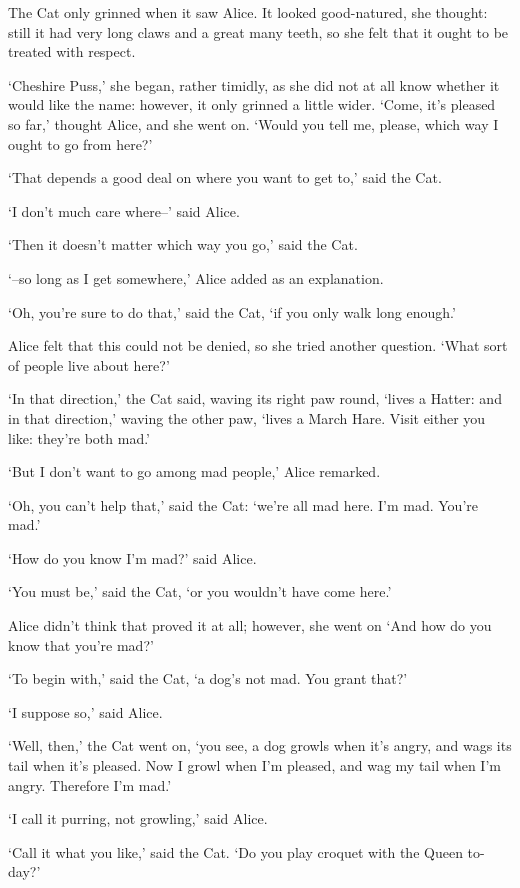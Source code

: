 \documentclass[statementpaper,twoside,openany]{memoir}
\begin{document}
The Cat only grinned when it saw Alice. It looked good-natured, she thought: still it had very long claws and a great many teeth, so she felt that it ought to be treated with respect.

`Cheshire Puss,' she began, rather timidly, as she did not at all know whether it would like the name: however, it only grinned a little wider. `Come, it's pleased so far,' thought Alice, and she went on. `Would you tell me, please, which way I ought to go from here?'

`That depends a good deal on where you want to get to,' said the Cat.

`I don't much care where--' said Alice.

`Then it doesn't matter which way you go,' said the Cat.

`--so long as I get somewhere,' Alice added as an explanation.

`Oh, you're sure to do that,' said the Cat, `if you only walk long enough.'

Alice felt that this could not be denied, so she tried another question. `What sort of people live about here?'

`In that direction,' the Cat said, waving its right paw round, `lives a Hatter: and in that direction,' waving the other paw, `lives a March Hare. Visit either you like: they're both mad.'

`But I don't want to go among mad people,' Alice remarked.

`Oh, you can't help that,' said the Cat: `we're all mad here. I'm mad. You're mad.'

`How do you know I'm mad?' said Alice.

`You must be,' said the Cat, `or you wouldn't have come here.'

Alice didn't think that proved it at all; however, she went on `And how do you know that you're mad?'

`To begin with,' said the Cat, `a dog's not mad. You grant that?'

`I suppose so,' said Alice.

`Well, then,' the Cat went on, `you see, a dog growls when it's angry, and wags its tail when it's pleased. Now I growl when I'm pleased, and wag my tail when I'm angry. Therefore I'm mad.'

`I call it purring, not growling,' said Alice.

`Call it what you like,' said the Cat. `Do you play croquet with the Queen to-day?'
\end{document}
